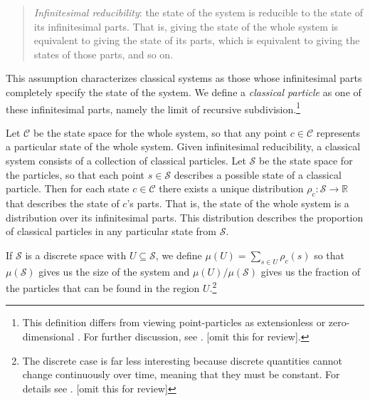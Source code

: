 \documentclass[letterpaper]{article}
\begin{document}
\begin{quotation}
\noindent
\textit{Infinitesimal reducibility}: the state of the system is reducible to the state of its infinitesimal parts. That is, giving the state of the whole system is equivalent to giving the state of its parts, which is equivalent to giving the states of those parts, and so on.
\end{quotation}

\noindent
This assumption characterizes classical systems as those whose infinitesimal parts completely specify the state of the system. We define a \textit{classical particle} as one of these infinitesimal parts, namely the limit of recursive subdivision.\footnote{This definition differs from viewing point-particles as extensionless \parencites[]{Butterfieldpoints} or zero-dimensional \parencites[]{Wilson}. For further discussion, see \textcites{shpmp}. [omit this for review].}

Let $\mathcal{C}$ be the state space for the whole system, so that any point $c \in \mathcal{C}$ represents a particular state of the whole system. Given infinitesimal reducibility, a classical system consists of a collection of classical particles. Let $\mathcal{S}$ be the state space for the particles, so that each point $s \in \mathcal{S}$ describes a possible state of a classical particle. Then for each state $c \in \mathcal{C}$ there exists a unique distribution $\rho_c : \mathcal{S} \to \mathbb{R} $ that describes the state of $c$'s parts. That is, the state of the whole system is a distribution over its infinitesimal parts. This distribution describes the proportion of classical particles in any particular state from $\mathcal{S}$.

If $\mathcal{S}$ is a discrete space with $U \subseteq \mathcal{S}$, we define $\mu(U) = \sum\limits_{s \in U} \rho_c(s)$ so that $\mu(\mathcal{S})$ gives us the size of the system and $\mu(U)/\mu(\mathcal{S})$ gives us the fraction of the particles that can be found in the region $U$.\footnote{The discrete case is far less interesting because discrete quantities cannot change continuously over time, meaning that they must be constant. For details see \textcites[]{AoPPhy1}. [omit this for review]}
\end{document}
